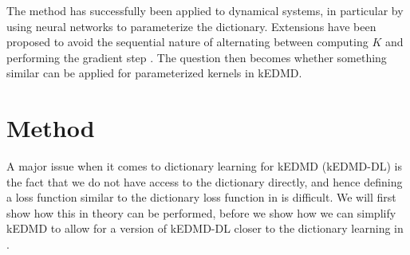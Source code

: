 \documentclass{article}
\begin{document}
The method has successfully been applied to dynamical systems, in particular by using neural networks to parameterize the dictionary. Extensions have been proposed to avoid the sequential nature of alternating between computing \(K\) and performing the gradient step \citep{constante-amoresricardo-2024}. The question then becomes whether something similar can be applied for parameterized kernels in kEDMD.

\section{Method}\label{sec:method}
A major issue when it comes to dictionary learning for kEDMD (kEDMD-DL) is the fact that we do not have access to the dictionary directly, and hence defining a loss function similar to the dictionary loss function in  is difficult. We will first show how this in theory can be performed, before we show how we can simplify kEDMD to allow for a version of kEDMD-DL closer to the dictionary learning in .
\end{document}
